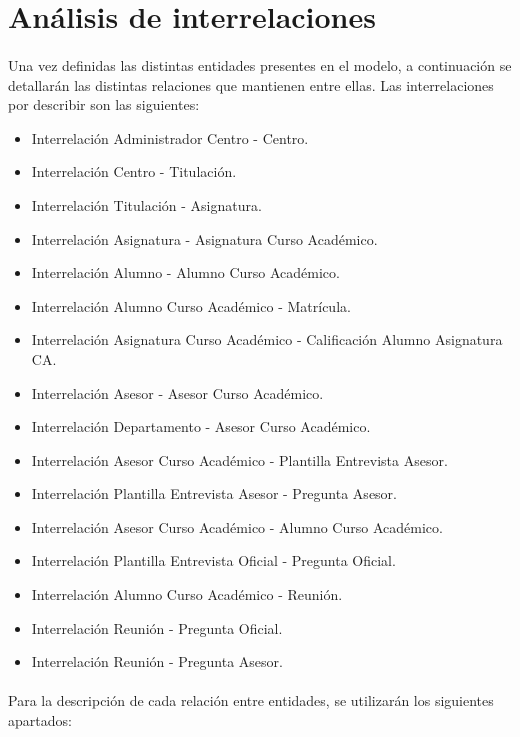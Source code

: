\section{Análisis de interrelaciones}

   \paragraph{}Una vez definidas las distintas entidades presentes en el
   modelo, a continuación se detallarán las distintas relaciones que mantienen
   entre ellas. Las interrelaciones por describir son las siguientes:

   \begin{itemize}
    \item Interrelación Administrador Centro - Centro.
    \item Interrelación Centro - Titulación.
    \item Interrelación Titulación - Asignatura.
    \item Interrelación Asignatura - Asignatura Curso Académico.
    \item Interrelación Alumno - Alumno Curso Académico.
    \item Interrelación Alumno Curso Académico - Matrícula.
    \item Interrelación Asignatura Curso Académico - Calificación Alumno Asignatura CA.
    \item Interrelación Asesor - Asesor Curso Académico.
    \item Interrelación Departamento - Asesor Curso Académico.
    \item Interrelación Asesor Curso Académico - Plantilla Entrevista Asesor.
    \item Interrelación Plantilla Entrevista Asesor - Pregunta Asesor.
    \item Interrelación Asesor Curso Académico - Alumno Curso Académico.
    \item Interrelación Plantilla Entrevista Oficial - Pregunta Oficial.
    \item Interrelación Alumno Curso Académico - Reunión.
    \item Interrelación Reunión - Pregunta Oficial.
    \item Interrelación Reunión - Pregunta Asesor.
   \end{itemize}

   \paragraph{}Para la descripción de cada relación entre entidades, se
   utilizarán los siguientes apartados:


